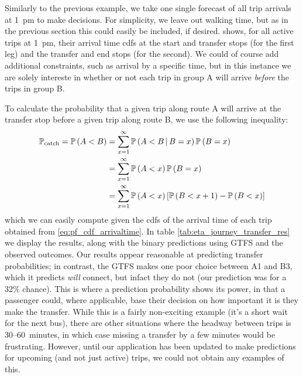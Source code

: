 Similarly to the previous example, we take one single forecast of all trip arrivals at 1~pm to make decisions. For simplicity, we leave out walking time, but as in the previous section this could easily be included, if desired.  shows, for all active trips at 1~pm, their arrival time \glspl{cdf} at the start and transfer stops (for the first leg) and the transfer and end stops (for the second). We could of course add additional constraints, such as arrival by a specific time, but in this instance we are solely intereste in whether or not each trip in group A will arrive \emph{before} the trips in group B.


To calculate the probability that a given trip along route A will arrive at the transfer stop before a given trip along route B, we use the following inequality:
\begin{equation}
\label{eq:eta_total_prob}
\begin{split}
\mathbb{P}_\text{catch} =
\mathbb{P}\left(A < B\right) &= \sum_{x=1}^{\infty} \mathbb{P}\left(A < B\,|\,B = x\right)\mathbb{P}\left(B=x\right) \\
  &= \sum_{x=1}^\infty
    \mathbb{P}\left(A < x\right) \mathbb{P}\left(B=x\right) \\
  &= \sum_{x=1}^\infty
    \mathbb{P}\left(A < x\right) \left[
      \mathbb{P}\left(B < x + 1\right) - \mathbb{P}\left(B < x\right)
    \right]
\end{split}
\end{equation}
which we can easily compute given the \glspl{cdf} of the arrival time of each trip obtained from \cref{eq:pf_cdf_arrivaltime}. In table \cref{tab:eta_journey_transfer_res} we display the results, along with the binary predictions using GTFS and the observed outcomes. Our results appear reasonable at predicting transfer probabilities; in contrast, the GTFS makes one poor choice between A1 and B3, which it predicts \emph{will} connect, but infact they do not (our prediction was for a 32\% chance). This is where a prediction probability shows its power, in that a passenger could, where applicable, base their decision on how important it is they make the transfer. While this is a fairly non-exciting example (it's a short wait for the next bus), there are other situations where the headway between trips is 30--60~minutes, in which case missing a transfer by a few minutes would be frustrating. However, until our application has been updated to make predictions for upcoming (and not just active) trips, we could not obtain any examples of this.


